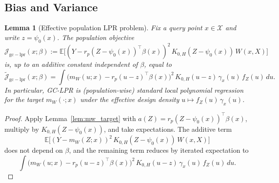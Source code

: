 \documentclass[final,1p,times,authoryear]{elsarticle}
\newtheorem{lemma}{Lemma}
\newcommand{\Jcal}{\mathcal{J}}
\begin{document}
\subsection{Bias and Variance}

\begin{lemma}[Effective population LPR problem]
\label{lem:weighted_target}
Fix a query point \(x\in\mathcal{X}\) and write \(z=\psi_0(x)\). The population objective
\[
\Jcal_{\mathrm{gc-lpr}}(x;\beta)
:= \mathbb{E}\Big[(Y - r_p(Z-\psi_0(x))^\top\beta(x))^2\,K_{0,H}(Z-\psi_0(x))\,W(x,X)\Big]
\]
is, up to an additive constant independent of \(\beta\), equal to
\[
\tilde{\Jcal}_{\mathrm{gc-lpr}}(x;\beta)
=
\int \Big(m_W(u;x)-r_p(u-z)^\top\beta(x)\Big)^2\,K_{0,H}(u-z)\,\gamma_x(u)\,f_Z(u)\,du.
\]
In particular, GC-LPR is (population-wise) standard local polynomial regression for the target \(m_W(\cdot;x)\)
under the effective design density \(u\mapsto f_Z(u)\,\gamma_x(u)\).
\end{lemma}
\begin{proof}
Apply Lemma~\ref{lem:mw_target} with \(a(Z)=r_p(Z-\psi_0(x))^\top\beta(x)\), multiply by \(K_{0,H}(Z-\psi_0(x))\), and take expectations. The additive term
\[
\mathbb{E}\Big[(Y-m_W(Z;x))^2\,K_{0,H}(Z-\psi_0(x))\,W(x,X)\Big]
\]
does not depend on \(\beta\), and the remaining term reduces by iterated expectation to
\[
\int \Big(m_W(u;x)-r_p(u-z)^\top\beta(x)\Big)^2\,K_{0,H}(u-z)\,\gamma_x(u)\,f_Z(u)\,du.
\]
\end{proof}
\end{document}
